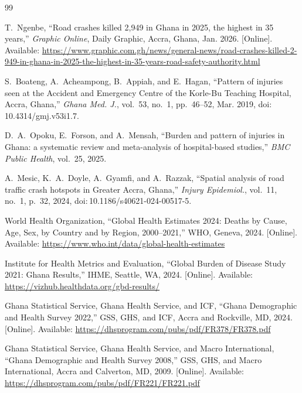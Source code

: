 \documentclass[conference]{IEEEtran}
\begin{document}
\sloppy
\begin{thebibliography}{99}

T.~Ngenbe,
``Road crashes killed 2{,}949 in Ghana in 2025, the highest in 35
years,''
\textit{Graphic Online}, Daily Graphic, Accra, Ghana, Jan. 2026.
[Online]. Available:
\url{https://www.graphic.com.gh/news/general-news/road-crashes-killed-2-949-in-ghana-in-2025-the-highest-in-35-years-road-safety-authority.html}

S.~Boateng, A.~Acheampong, B.~Appiah, and E.~Hagan,
``Pattern of injuries seen at the Accident and Emergency Centre of
the Korle-Bu Teaching Hospital, Accra, Ghana,''
\textit{Ghana Med. J.}, vol.~53, no.~1, pp.~46--52, Mar. 2019,
doi:\,10.4314/gmj.v53i1.7.

D.~A.~Opoku, E.~Forson, and A.~Mensah,
``Burden and pattern of injuries in Ghana: a systematic review and
meta-analysis of hospital-based studies,''
\textit{BMC Public Health}, vol.~25, 2025.

A.~Mesic, K.~A.~Doyle, A.~Gyamfi, and A.~Razzak,
``Spatial analysis of road traffic crash hotspots in Greater Accra,
Ghana,''
\textit{Injury Epidemiol.}, vol.~11, no.~1, p.~32, 2024,
doi:\,10.1186/s40621-024-00517-5.

World Health Organization,
``Global Health Estimates 2024: Deaths by Cause, Age, Sex, by
Country and by Region, 2000--2021,''
WHO, Geneva, 2024.
[Online]. Available:
\url{https://www.who.int/data/global-health-estimates}

Institute for Health Metrics and Evaluation,
``Global Burden of Disease Study 2021: Ghana Results,''
IHME, Seattle, WA, 2024.
[Online]. Available:
\url{https://vizhub.healthdata.org/gbd-results/}

Ghana Statistical Service, Ghana Health Service, and ICF,
``Ghana Demographic and Health Survey 2022,''
GSS, GHS, and ICF, Accra and Rockville, MD, 2024.
[Online]. Available:
\url{https://dhsprogram.com/pubs/pdf/FR378/FR378.pdf}

Ghana Statistical Service, Ghana Health Service, and Macro
International,
``Ghana Demographic and Health Survey 2008,''
GSS, GHS, and Macro International, Accra and Calverton, MD, 2009.
[Online]. Available:
\url{https://dhsprogram.com/pubs/pdf/FR221/FR221.pdf}


\end{thebibliography}
\end{document}

